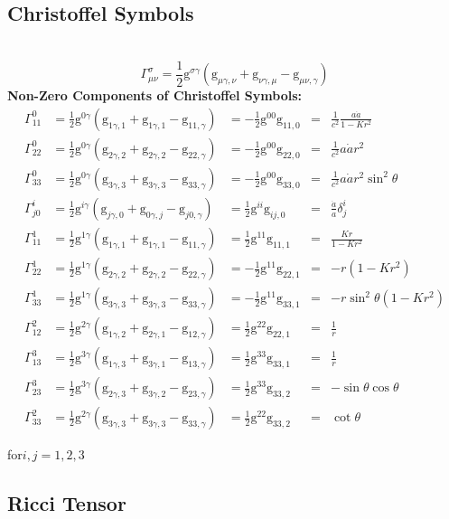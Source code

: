 \documentclass[14pt]{article}
\newcommand{\csg}[2]{\Gamma^{#1}_{#2}}
\newcommand{\g}{\mathrm{g}}
\newcommand{\csge}[3]{\frac{1}{2} \mathrm{g}^{#1\gamma}(\mathrm{g}_{#2\gamma, #3}+\mathrm{g}_{#3 \gamma,#2}-\mathrm{g}_{#2 #3,\gamma})}
\begin{document}
\subsection{Christoffel Symbols}
\quad\\

\[
\csg{\sigma}{\mu\nu}=\csge{\sigma}{\mu}{\nu}\tag{1.2.1}
\]
\textbf{Non-Zero Components of Christoffel Symbols:}
\begin{align*}
\csg{0}{11} &= \csge{0}{1}{1}&= -\frac{1}{2}\g^{00}\g_{11,0}&=& \frac{1}{c^{2}}\frac{a\Dot{a}}{1-Kr^{2}}\tag{1.2.2}\\
\csg{0}{22} &= \csge{0}{2}{2}&= -\frac{1}{2}\g^{00}\g_{22,0}&=& \frac{1}{c^{2}}a\Dot{a}r^{2}\tag{1.2.3}\\
\csg{0}{33} &= \csge{0}{3}{3}&= -\frac{1}{2}\g^{00}\g_{33,0}&=& \frac{1}{c^{2}}a\Dot{a}r^{2}\sin^{2}\theta\tag{1.2.4}\\
\csg{i}{j0} &= \csge{i}{j}{0}  &= \frac{1}{2}\g^{ii}\g_{ij,0}&=& \frac{\Dot{a}}{a}\delta^{i}_{j}\tag{1.2.5}\\
\csg{1}{11} &= \csge{1}{1}{1}  &= \frac{1}{2}\g^{11}\g_{11,1}&=& \frac{Kr}{1-Kr^{2}}\tag{1.2.6}\\
\csg{1}{22} &= \csge{1}{2}{2} &= -\frac{1}{2}\g^{11}\g_{22,1}&=& -r(1-Kr^{2}) \tag{1.2.7}\\   
\csg{1}{33} &= \csge{1}{3}{3} &= -\frac{1}{2}\g^{11}\g_{33,1}&=& -r\sin^{2}\theta(1-Kr^{2}) \tag{1.2.8}\\  
\csg{2}{12} &=  \csge{2}{1}{2} &= \frac{1}{2}\g^{22}\g_{22,1}&=& \frac{1}{r} \tag{1.2.9}\\
\csg{3}{13} &= \csge{3}{1}{3}  &= \frac{1}{2}\g^{33}\g_{33,1}&=& \frac{1}{r}  \tag{1.2.10}\\ 
\csg{3}{23} &= \csge{3}{2}{3}  &= \frac{1}{2}\g^{33}\g_{33,2}&=& -\sin \theta \cos \theta  \tag{1.2.11}\\
\csg{2}{33} &= \csge{2}{3}{3}  &= \frac{1}{2}\g^{22}\g_{33,2}&= &\cot \theta  \tag{1.2.12}
\end{align*}

for\(i,j=1,2,3\)
\subsection{Ricci Tensor}
\end{document}
